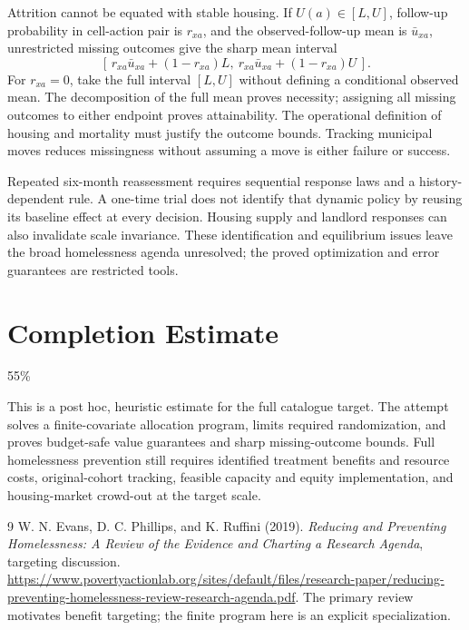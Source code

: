 \documentclass[11pt,a4paper]{article}
\begin{document}
Attrition cannot be equated with stable housing. If $U(a)\in[L,U]$, follow-up probability in cell-action pair is $r_{xa}$, and the observed-follow-up mean is $\bar u_{xa}$, unrestricted missing outcomes give the sharp mean interval
\[
 [\,r_{xa}\bar u_{xa}+(1-r_{xa})L,\
    r_{xa}\bar u_{xa}+(1-r_{xa})U\,].
\]
For $r_{xa}=0$, take the full interval $[L,U]$ without defining a conditional observed mean. The decomposition of the full mean proves necessity; assigning all missing outcomes to either endpoint proves attainability. The operational definition of housing and mortality must justify the outcome bounds. Tracking municipal moves reduces missingness without assuming a move is either failure or success.

Repeated six-month reassessment requires sequential response laws and a history-dependent rule. A one-time trial does not identify that dynamic policy by reusing its baseline effect at every decision. Housing supply and landlord responses can also invalidate scale invariance. These identification and equilibrium issues leave the broad homelessness agenda unresolved; the proved optimization and error guarantees are restricted tools.

\section{Completion Estimate}
55\%

This is a post hoc, heuristic estimate for the full catalogue target.
The attempt solves a finite-covariate allocation program, limits required randomization, and proves budget-safe value guarantees and sharp missing-outcome bounds. Full homelessness prevention still requires identified treatment benefits and resource costs, original-cohort tracking, feasible capacity and equity implementation, and housing-market crowd-out at the target scale.

\begin{thebibliography}{9}
 W. N. Evans, D. C. Phillips, and K. Ruffini (2019).
\emph{Reducing and Preventing Homelessness: A Review of the Evidence and Charting a Research Agenda}, targeting discussion.
\url{https://www.povertyactionlab.org/sites/default/files/research-paper/reducing-preventing-homelessness-review-research-agenda.pdf}.
The primary review motivates benefit targeting; the finite program here is an explicit specialization.
\end{thebibliography}
\end{document}
